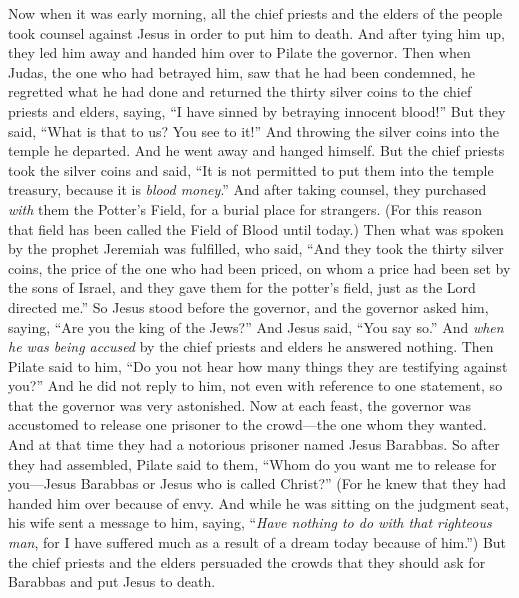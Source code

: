 \begin{biblechapter} %
 Now when it was early morning, all the chief priests and the elders of the people took counsel against Jesus in order to put him to death.
\verse And after tying him up, they led him away and handed him over to Pilate the governor.
 Then when Judas, the one who had betrayed him, saw that he had been condemned, he regretted what he had done and returned the thirty silver coins to the chief priests and elders,
\verse saying, “I have sinned by betraying innocent blood!” But they said, “What is that to us? You see to it!”
\verse And throwing the silver coins into the temple he departed. And he went away and hanged himself.
\verse But the chief priests took the silver coins and said, “It is not permitted to put them into the temple treasury, because it is \textit{blood money}.”
\verse And after taking counsel, they purchased \textit{with} them the Potter’s Field, for a burial place for strangers.
\verse (For this reason that field has been called the Field of Blood until today.)
\verse Then what was spoken by the prophet Jeremiah was fulfilled, who said, “And they took the thirty silver coins, the price of the one who had been priced, on whom a price had been set by the sons of Israel,
\verse and they gave them for the potter’s field, just as the Lord directed me.”
 So Jesus stood before the governor, and the governor asked him, saying, “Are you the king of the Jews?” And Jesus said, “You say so.”
\verse And \textit{when he was being accused} by the chief priests and elders he answered nothing.
\verse Then Pilate said to him, “Do you not hear how many things they are testifying against you?”
\verse And he did not reply to him, not even with reference to one statement, so that the governor was very astonished.
 Now at each feast, the governor was accustomed to release one prisoner to the crowd—the one whom they wanted.
\verse And at that time they had a notorious prisoner named Jesus Barabbas.
\verse So after they had assembled, Pilate said to them, “Whom do you want me to release for you—Jesus Barabbas or Jesus who is called Christ?”
\verse (For he knew that they had handed him over because of envy.
\verse And while he was sitting on the judgment seat, his wife sent a message to him, saying, “\textit{Have nothing to do with that righteous man}, for I have suffered much as a result of a dream today because of him.”)
\verse But the chief priests and the elders persuaded the crowds that they should ask for Barabbas and put Jesus to death.

\end{biblechapter}
